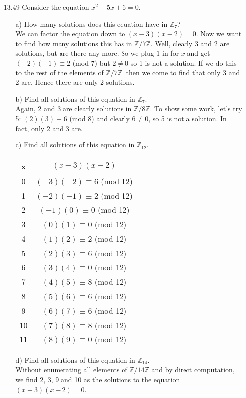 \documentclass[12pt]{article}
\begin{document}
\begin{enumerate}
\item[13.49] Consider the equation $x^2 - 5x + 6 = 0$.
\begin{enumerate}
\item[a)] How many solutions does this equation have in $\mathbb{Z}_7$?\\
We can factor the equation down to $(x - 3)(x - 2) = 0$. Now we want to find how many solutions
this has in $\mathbb{Z}/7\mathbb{Z}$. Well, clearly $3$ and $2$ are solutions, but are there any more.
So we plug $1$ in for $x$ and get $(-2)(-1) \equiv 2$ (mod 7) but $2 \neq 0$ so 1 is not a solution. If we
do this to the rest of the elements of $\mathbb{Z}/7\mathbb{Z}$, then we come to find that only 3 and 2 are.
Hence there are only 2 solutions.
\item[b)] Find all solutions of this equation in $\mathbb{Z}_7$.\\
Again, 2 and 3 are clearly solutions in $\mathbb{Z}/8\mathbb{Z}$. To show some work, let's try 5:
$(2)(3) \equiv 6$ (mod 8) and clearly $6 \neq 0$, so 5 is not a solution. In fact, only 2 and 3 are.
\item[c)] Find all solutions of this equation in $\mathbb{Z}_{12}$.\\
\begin{tabular}{|c|c|}
\hline
x & $(x - 3)(x - 2)$ \\
\hline
0 & $(-3)(-2) \equiv 6$ (mod 12) \\ 
\hline
1 & $(-2)(-1) \equiv 2$ (mod 12) \\
\hline
2 & $(-1)(0) \equiv 0$ (mod 12) \\
\hline
3 & $(0)(1) \equiv 0$ (mod 12) \\
\hline
4 & $(1)(2) \equiv 2$ (mod 12) \\ 
\hline
5 & $(2)(3) \equiv 6$ (mod 12) \\
\hline
6 & $(3)(4) \equiv 0$ (mod 12) \\
\hline
7 & $(4)(5) \equiv 8$ (mod 12) \\
\hline
8 & $(5)(6) \equiv 6$ (mod 12) \\ 
\hline
9 & $(6)(7) \equiv 6$ (mod 12) \\
\hline
10 & $(7)(8) \equiv 8$ (mod 12) \\
\hline
11 & $(8)(9) \equiv 0$ (mod 12) \\
\hline 
\end{tabular}
\item[d)] Find all solutions of this equation in $\mathbb{Z}_{14}$.\\
Without enumerating all elements of $\mathbb{Z}/14\mathbb{Z}$ and by direct computation, we find
2, 3, 9 and 10 as the solutions to the equation $(x - 3)(x - 2) = 0$.
\end{enumerate}


\end{enumerate}
\end{document}
